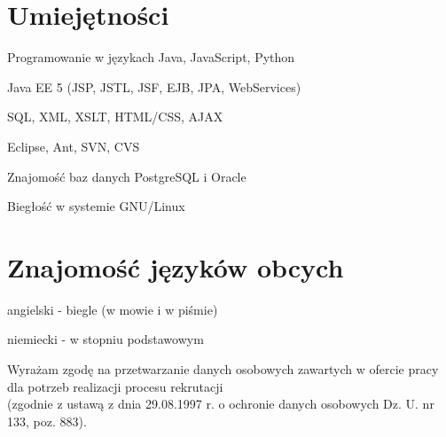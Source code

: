 \documentclass[letterpaper]{article}
\renewenvironment{itemize}{
  \begin{list}{}{
    \setlength{\leftmargin}{1.5em}
  }
}{
  \end{list}
}
\begin{document}
\section*{Umiejętności}

\begin{itemize}
\item Programowanie w językach Java, JavaScript, Python
\item Java EE 5 (JSP, JSTL, JSF, EJB, JPA, WebServices)
\item SQL, XML, XSLT, HTML/CSS, AJAX
\item Eclipse, Ant, SVN, CVS
\item Znajomość baz danych PostgreSQL i Oracle
\item Biegłość w systemie GNU/Linux
\end{itemize}


\section*{Znajomość języków obcych}

\begin{itemize}
\item angielski - biegle (w mowie i w piśmie)
\item niemiecki - w stopniu podstawowym
\end{itemize}


\bigskip

\begin{center}
  \begin{footnotesize}
    Wyrażam zgodę na przetwarzanie danych osobowych zawartych w ofercie pracy dla potrzeb realizacji procesu rekrutacji\\
    (zgodnie z ustawą z dnia 29.08.1997 r. o ochronie danych osobowych Dz. U. nr 133, poz. 883).
  \end{footnotesize}
\end{center}
\end{document}
